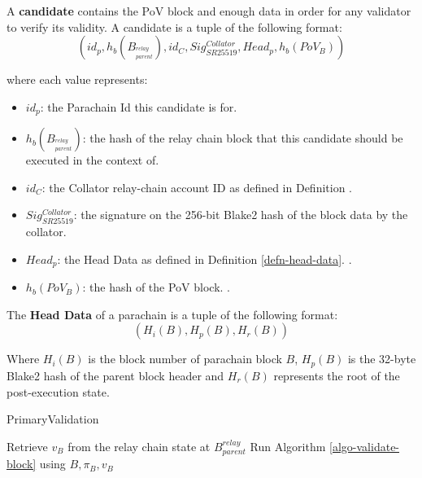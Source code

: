 \begin{definition}
  \label{defn-candidate}
  A \textbf{candidate} contains the PoV block and enough data in order for any
  validator to verify its validity. A candidate is a tuple of the following
  format:
  \[
  (id_p, h_b({B_{^{relay}_{parent}}}), id_{C}, Sig^{Collator}_{SR25519}, Head_p, h_b({PoV_B}))
  \]

  where each value represents:
  \begin{itemize}
    \item $id_p$: the Parachain Id this candidate is for.
    \item $h_b({B_{^{relay}_{parent}}})$: the hash of the relay chain block that this
    candidate should be executed in the context of.
    \item $id_C$: the Collator relay-chain account ID as defined in Definition
    .
    \item $Sig^{Collator}_{SR25519}$: the signature on the 256-bit Blake2 hash
    of the block data by the collator.
    \item $Head_p$: the Head Data as defined in Definition \ref{defn-head-data}.
    .
    \item $h_b({PoV_B})$: the hash of the PoV block.
    .
  \end{itemize}

\end{definition}

\begin{definition}
  \label{defn-head-data}
  The \textbf{Head Data} of a parachain is a tuple of the following format:
  \[
    (H_i(B), H_p(B), H_r(B))
  \]

  Where $H_i(B)$ is the block number of parachain block $B$, $H_p(B)$ is the
  32-byte Blake2 hash of the parent block header and $H_r(B)$ represents the
  root of the post-execution state.
\end{definition}

\begin{algorithm}
  \caption[]{\sc PrimaryValidation}
  \label{algo-primary-validation}
  \begin{algorithmic}[1]

    \State Retrieve $v_B$ from the relay chain state at $B^{relay}_{parent}$
    \State Run Algorithm \ref{algo-validate-block} using $B, \pi_B, v_B$
  \end{algorithmic}
\end{algorithm}

